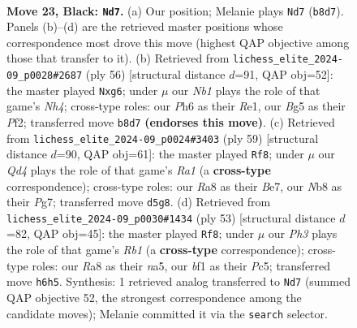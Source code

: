 \documentclass[11pt]{article}
\begin{document}
\clearpage

\begin{figure}[p]\centering
\begin{subfigure}{0.46\textwidth}\centering
\resizebox{\linewidth}{!}{%
\newchessgame
\chessboard[
  setfen={rnQ5/pp4kp/7p/1P1q2b1/3P2P1/4rP2/4N3/R2K1B1R b - - 1 23},
  showmover=false,
  pgfstyle=straightmove, color=movearrow, markmove={b8-d7}
]}
\caption{}
\end{subfigure}\hfill
\begin{subfigure}{0.46\textwidth}\centering
\resizebox{\linewidth}{!}{%
\newchessgame
\chessboard[
  setfen={3r4/pb1Pr1k1/1p2ppn1/7q/2PQ3N/P5PB/1P3P2/4R1K1 w - - 1 29},
  showmover=false,
  pgfstyle=straightmove, color=movearrow, markmove={h4-g6}
]}
\caption{}
\end{subfigure}
\\[4pt]
\begin{subfigure}{0.46\textwidth}\centering
\resizebox{\linewidth}{!}{%
\newchessgame
\chessboard[
  setfen={r5k1/4b1p1/2q1P1Qp/P1p4n/1p6/1P5P/1B4P1/5RK1 b - - 0 30},
  showmover=false,
  pgfstyle=straightmove, color=movearrow, markmove={a8-f8}
]}
\caption{}
\end{subfigure}\hfill
\begin{subfigure}{0.46\textwidth}\centering
\resizebox{\linewidth}{!}{%
\newchessgame
\chessboard[
  setfen={1r4k1/7p/R2pp1p1/NPprP3/8/2P3Pq/Q6P/4R2K b - - 0 27},
  showmover=false,
  pgfstyle=straightmove, color=movearrow, markmove={b8-f8}
]}
\caption{}
\end{subfigure}
\caption{\textbf{Move 23, Black: \texttt{Nd7}.} (a) Our position; Melanie plays \texttt{Nd7} (\texttt{b8d7}). Panels (b)--(d) are the retrieved master positions whose correspondence most drove this move (highest QAP objective among those that transfer to it). (b) Retrieved from \texttt{lichess\_elite\_2024-09\_p0028\#2687} (ply 56) [structural distance $d$=91, QAP obj=52]: the master played \texttt{Nxg6}; under $\mu$ our \emph{Nb1} plays the role of that game's \emph{Nh4}; cross-type roles: our \emph{P}h6 as their \emph{R}e1, our \emph{B}g5 as their \emph{P}f2; transferred move \texttt{b8d7} \textbf{(endorses this move)}. (c) Retrieved from \texttt{lichess\_elite\_2024-09\_p0024\#3403} (ply 59) [structural distance $d$=90, QAP obj=61]: the master played \texttt{Rf8}; under $\mu$ our \emph{Qd4} plays the role of that game's \emph{Ra1} (a \textbf{cross-type} correspondence); cross-type roles: our \emph{R}a8 as their \emph{B}e7, our \emph{N}b8 as their \emph{P}g7; transferred move \texttt{d5g8}. (d) Retrieved from \texttt{lichess\_elite\_2024-09\_p0030\#1434} (ply 53) [structural distance $d$=82, QAP obj=45]: the master played \texttt{Rf8}; under $\mu$ our \emph{Ph3} plays the role of that game's \emph{Rb1} (a \textbf{cross-type} correspondence); cross-type roles: our \emph{R}a8 as their \emph{n}a5, our \emph{b}f1 as their \emph{P}c5; transferred move \texttt{h6h5}. Synthesis: 1 retrieved analog transferred to \texttt{Nd7} (summed QAP objective 52, the strongest correspondence among the candidate moves); Melanie committed it via the \texttt{search} selector.}
\label{fig:thought-m45}
\end{figure}
\end{document}
